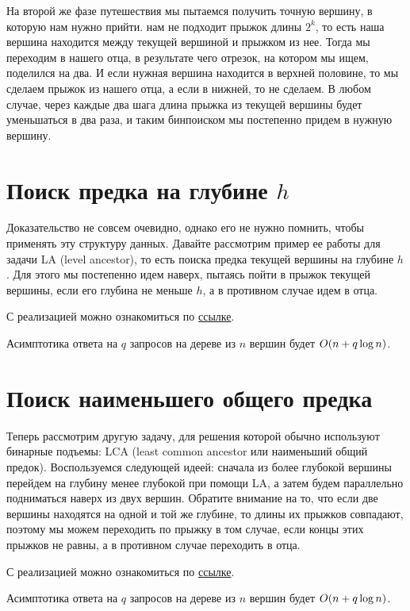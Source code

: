 На второй же фазе путешествия мы пытаемся получить точную вершину, в которую нам нужно прийти. нам не подходит прыжок длины $2^k$, то есть наша вершина находится между текущей вершиной и прыжком из нее. Тогда мы переходим в нашего отца, в результате чего отрезок, на котором мы ищем, поделился на два. И если нужная вершина находится в верхней половине, то мы сделаем прыжок из нашего отца, а если в нижней, то не сделаем. В любом случае, через каждые два шага длина прыжка из текущей вершины будет уменьшаться в два раза, и таким бинпоиском мы постепенно придем в нужную вершину.

\section{Поиск предка на глубине $h$}

Доказательство не совсем очевидно, однако его не нужно помнить, чтобы применять эту структуру данных. Давайте рассмотрим пример ее работы для задачи LA (level ancestor), то есть поиска предка текущей вершины на глубине $h$. Для этого мы постепенно идем наверх, пытаясь пойти в прыжок текущей вершины, если его глубина не меньше $h$, а в противном случае идем в отца.

С реализацией можно ознакомиться по \href{https://pastebin.com/tyrL8gMQ}{ссылке}.

Асимптотика ответа на $q$ запросов на дереве из $n$ вершин будет $O(n + q \log n)$.

\section{Поиск наименьшего общего предка}

Теперь рассмотрим другую задачу, для решения которой обычно используют бинарные подъемы: LCA (least common ancestor или наименьший общий предок). Воспользуемся следующей идеей: сначала из более глубокой вершины перейдем на глубину менее глубокой при помощи LA, а затем будем параллельно подниматься наверх из двух вершин. Обратите внимание на то, что если две вершины находятся на одной и той же глубине, то длины их прыжков совпадают, поэтому мы можем переходить по прыжку в том случае, если концы этих прыжков не равны, а в противном случае переходить в отца.

С реализацией можно ознакомиться по \href{https://pastebin.com/shHVMMBQ}{ссылке}.

Асимптотика ответа на $q$ запросов на дереве из $n$ вершин будет $O(n + q \log n)$.

